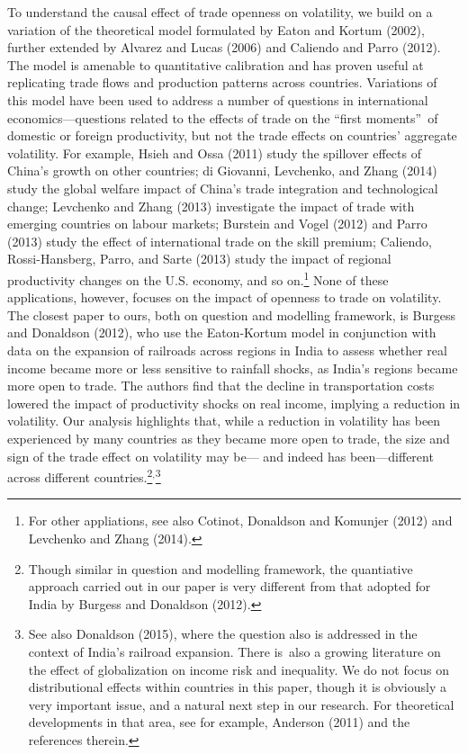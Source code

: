\documentclass[12pt]{article}
\begin{document}
To understand the causal effect of trade openness on volatility, we build on
a variation of the theoretical model formulated by Eaton and Kortum (2002),
further extended by Alvarez and Lucas (2006) and Caliendo and Parro (2012).
The model is amenable to quantitative calibration and has proven useful at
replicating trade flows and production patterns across countries. Variations
of this model have been used to address a number of questions in
international economics---questions related to the effects of trade on the
\textquotedblleft first moments\textquotedblright\ of domestic or foreign
productivity, but not the trade effects on countries' aggregate volatility.
For example, Hsieh and Ossa (2011) study the spillover effects of China's
growth on other countries; di Giovanni, Levchenko, and Zhang (2014) study
the global welfare impact of China's trade integration and technological
change; Levchenko and Zhang (2013) investigate the impact of trade with
emerging countries on labour markets; Burstein and Vogel (2012) and Parro
(2013) study the effect of international trade on the skill premium;
Caliendo, Rossi-Hansberg, Parro, and Sarte (2013) study the impact of
regional productivity changes on the U.S. economy, and so on.\footnote{%
For other appliations, see also Cotinot, Donaldson and Komunjer (2012) and
Levchenko and Zhang (2014).} None of these applications, however, focuses on
the impact of openness to trade on volatility. The closest paper to ours,
both on question and modelling framework, is Burgess and Donaldson (2012),
who use the Eaton-Kortum model in conjunction with data on the expansion of
railroads across regions in India to assess whether real income became more
or less sensitive to rainfall shocks, as India's regions became more open to
trade. The authors find that the decline in transportation costs lowered the
impact of productivity shocks on real income, implying a reduction in
volatility. Our analysis highlights that, while a reduction in volatility
has been experienced by many countries as they became more open to trade,
the size and sign of the trade effect on volatility may be--- and indeed has
been---different across different countries.\footnote{%
Though similar in question and modelling framework, the quantiative approach
carried out in our paper is very different from that adopted for India by
Burgess and Donaldson (2012).}$^{,}$\footnote{%
See also Donaldson (2015), where the question also is addressed in the
context of India's railroad expansion. There is\ also a growing literature
on the effect of globalization on income risk and inequality. We do not
focus on distributional effects within countries in this paper, though it is
obviously a very important issue, and a natural next step in our research.
For theoretical developments in that area, see for example, Anderson (2011)
and the references therein.}
\end{document}
